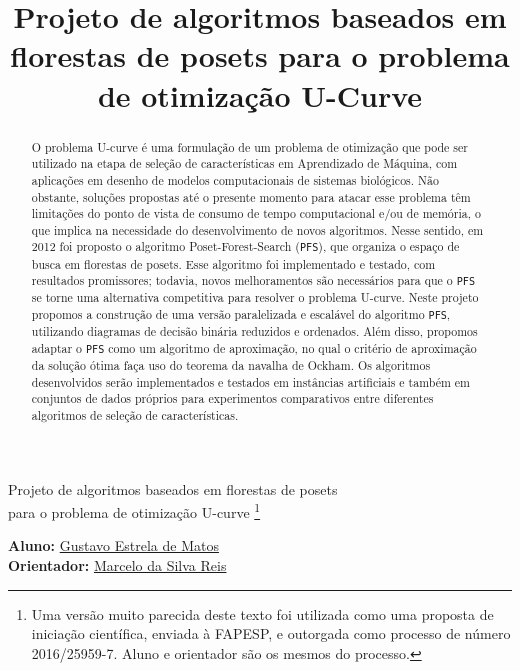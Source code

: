 \documentclass[12pt]{article}
\title{Projeto de algoritmos baseados em florestas de posets
para o problema de otimização U-Curve}
\begin{document}
\thispagestyle{empty} 
\begin{flushright}
    {\LARGE Projeto de algoritmos baseados em florestas de posets\\
        \bigskip 
        para o problema de otimização U-curve \footnote{Uma versão
        muito parecida deste texto foi utilizada como uma proposta de
        iniciação científica, enviada à FAPESP, e outorgada como 
        processo de número 2016/25959-7. Aluno e orientador são os 
        mesmos do processo.}}


  \bigskip
  \bigskip
        
  {\large {\bf Aluno:} \href{mailto:gustavo.estrela.matos@usp.br}
        {Gustavo Estrela de Matos}\\ 
  {\bf Orientador:} \href{mailto:marcelo.reis@butantan.gov.br}
        {Marcelo da Silva Reis}\\
  \bigskip
  }

  \bigskip
  \bigskip
\end{flushright}

\begin{abstract}
O problema U-curve é uma formulação de um problema de otimização que
pode ser utilizado na etapa de seleção de características em Aprendizado
de Máquina, com aplicações em desenho de modelos computacionais de 
sistemas biológicos. Não obstante, soluções propostas até o presente 
momento para atacar esse problema têm limitações do ponto de vista de 
consumo de tempo computacional e/ou de memória, o que implica na 
necessidade do desenvolvimento de novos algoritmos. Nesse sentido, em
2012 foi proposto o algoritmo Poset-Forest-Search ({\tt PFS}), que 
organiza o espaço de busca em florestas de posets. Esse algoritmo foi 
implementado e testado, com resultados promissores; todavia, novos 
melhoramentos são necessários para que o {\tt PFS} se torne uma 
alternativa competitiva para resolver o problema U-curve. Neste 
projeto propomos a construção de uma versão paralelizada e escalável 
do algoritmo {\tt PFS}, utilizando diagramas de decisão binária 
reduzidos e ordenados. Além disso, propomos adaptar o {\tt PFS} como 
um algoritmo de aproximação, no qual o critério de aproximação da 
solução ótima faça uso do teorema da navalha de Ockham. Os algoritmos 
desenvolvidos serão implementados e testados em instâncias artificiais 
e também em conjuntos de dados próprios para experimentos comparativos 
entre diferentes algoritmos de seleção de características.
\end{abstract}
\end{document}
